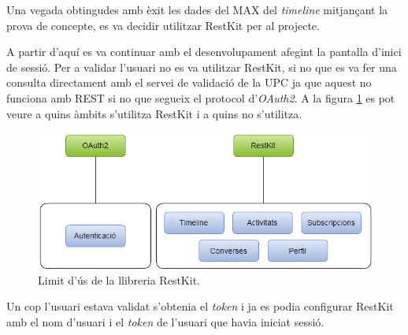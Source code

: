 Una vegada obtingudes amb èxit les dades del MAX del \textit{timeline} mitjançant la prova de concepte, es va decidir utilitzar RestKit per al projecte.

A partir d'aquí es va continuar amb el desenvolupament afegint la pantalla d'inici de sessió. Per a validar l'usuari no es va utilitzar RestKit, si no que es va fer una consulta directament amb el servei de validació de la UPC ja que aquest no funciona amb REST si no que segueix el protocol d'\textit{OAuth2}\cite{oauth2}. A la figura \ref{fig:limit_restkit} es pot veure a quins àmbits s'utilitza RestKit i a quins no s'utilitza.

\begin{figure}[ht]
    \centering
    \includegraphics[scale=0.6]{Memoria/Implementacio/LimitRestKit.png}
    \caption{Limit d'ús de la llibreria RestKit.}
    \label{fig:limit_restkit}
\end{figure}


Un cop l'usuari estava validat s'obtenia el \textit{token} i ja es podia configurar RestKit amb el nom d'usuari i el \textit{token} de l'usuari que havia iniciat sessió.




